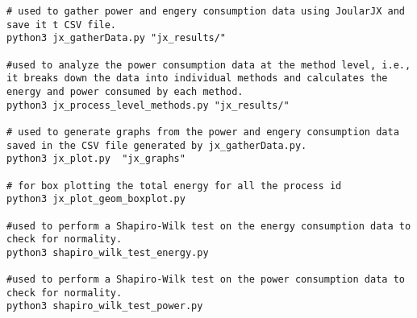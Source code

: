 \begin{lstlisting}
# used to gather power and engery consumption data using JoularJX and save it t CSV file.
python3 jx_gatherData.py "jx_results/"

#used to analyze the power consumption data at the method level, i.e., it breaks down the data into individual methods and calculates the energy and power consumed by each method.
python3 jx_process_level_methods.py "jx_results/"

# used to generate graphs from the power and engery consumption data saved in the CSV file generated by jx_gatherData.py.
python3 jx_plot.py  "jx_graphs"

# for box plotting the total energy for all the process id
python3 jx_plot_geom_boxplot.py

#used to perform a Shapiro-Wilk test on the energy consumption data to check for normality.
python3 shapiro_wilk_test_energy.py

#used to perform a Shapiro-Wilk test on the power consumption data to check for normality.
python3 shapiro_wilk_test_power.py
\end{lstlisting}




